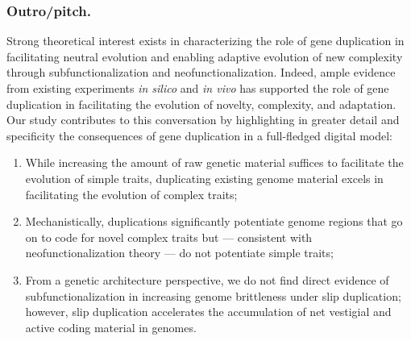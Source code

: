 \subsubsection{Outro/pitch.}
Strong theoretical interest exists in characterizing the role of gene duplication in facilitating neutral evolution and enabling adaptive evolution of new complexity through subfunctionalization and neofunctionalization.
Indeed, ample evidence from existing experiments \textit{in silico} and \textit{in vivo} has supported the role of gene duplication in facilitating the evolution of novelty, complexity, and adaptation.
Our study contributes to this conversation by highlighting in greater detail and specificity the consequences of gene duplication in a full-fledged digital model:
\begin{enumerate}
\item While increasing the amount of raw genetic material suffices to facilitate the evolution of simple traits, duplicating existing genome material excels in facilitating the evolution of complex traits;
\item Mechanistically, duplications significantly potentiate genome regions that go on to code for novel complex traits but --- consistent with neofunctionalization theory --- do not potentiate simple traits;
\item From a genetic architecture perspective, we do not find direct evidence of subfunctionalization in increasing genome brittleness under slip duplication; however, slip duplication accelerates the accumulation of net vestigial and active coding material in genomes.
\end{enumerate}

